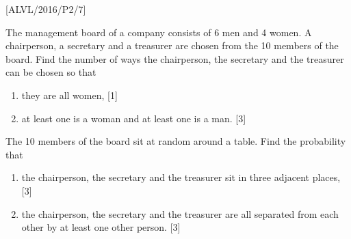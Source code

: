 \item {[}ALVL/2016/P2/7{]}

The management board of a company consists of 6 men and 4 women. A
chairperson, a secretary and a treasurer are chosen from the 10 members
of the board. Find the number of ways the chairperson, the secretary
and the treasurer can be chosen so that 
\begin{enumerate}
\item they are all women, \hfill{}{[}1{]}
\item at least one is a woman and at least one is a man. \hfill{}{[}3{]}
\end{enumerate}
The 10 members of the board sit at random around a table. Find the
probability that 
\begin{enumerate}
\item the chairperson, the secretary and the treasurer sit in three adjacent
places, \hfill{} {[}3{]}
\item the chairperson, the secretary and the treasurer are all separated
from each other by at least one other person. \hfill{}{[}3{]}
\end{enumerate}
